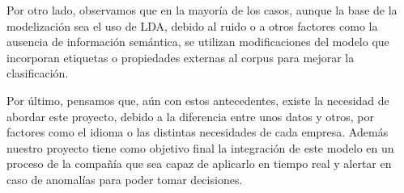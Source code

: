 Por otro lado, observamos que en la mayoría de los casos, aunque la base de la modelización sea el uso de LDA, debido al ruido o a otros factores como la ausencia de información semántica, se utilizan modificaciones del modelo que incorporan etiquetas o propiedades externas al corpus para mejorar la clasificación.

Por último, pensamos que, aún con estos antecedentes, existe la necesidad de abordar este proyecto, debido a la diferencia entre unos datos y otros, por factores como el idioma o las distintas necesidades de cada empresa. Además nuestro proyecto tiene como objetivo final la integración de este modelo en un proceso de la compañía que sea capaz de aplicarlo en tiempo real y alertar en caso de anomalías para poder tomar decisiones.

